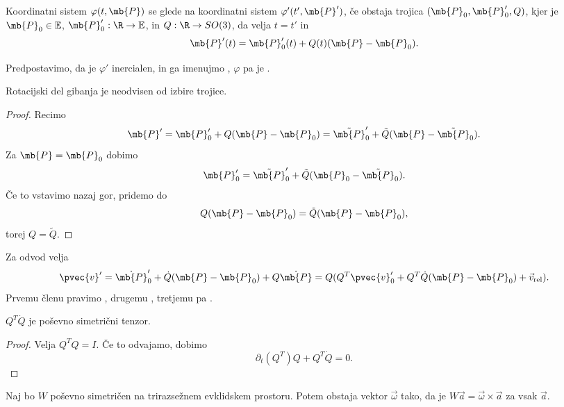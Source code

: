 
\begin{definicija}
  Koordinatni sistem $\varphi(t, \mb{P})$ se  glede na koordinatni
  sistem $\varphi'(t', \mb{P}')$, če obstaja trojica $(\mb{P}_0, \mb{P}_0', Q)$,
  kjer je $\mb{P}_0 \in \mathbb{E}$, $\mb{P}_0' : \R \to \mathbb{E}$, in $Q: \R
  \to SO(3)$, da velja $t = t'$ in
  \[
	\mb{P}'(t) = \mb{P}_0'(t) + Q(t) (\mb{P} - \mb{P}_0).
  \]
\end{definicija}

Predpostavimo, da je $\varphi'$ inercialen, in ga imenujmo , $\varphi$ pa je .

\begin{trditev}
  Rotacijski del gibanja je neodvisen od izbire trojice.
\end{trditev}

\begin{proof}
  Recimo
  \[
	\mb{P}' = \mb{P}_0' + Q (\mb{P} - \mb{P}_0)
	= \tilde{\mb{P}}_0' + \tilde{Q} (\mb{P} - \tilde{\mb{P}}_0).
  \]
  Za $\mb{P} = \mb{P}_0$ dobimo
  \[
	\mb{P}_0' = \tilde{\mb{P}}_0' + \tilde{Q} (\mb{P}_0 - \tilde{\mb{P}}_0).
  \]
  Če to vstavimo nazaj gor, pridemo do
  \[
	Q(\mb{P} - \mb{P}_0) = \tilde{Q}(\mb{P} - \mb{P}_0),
  \]
  torej $Q = \tilde{Q}$.
\end{proof}


Za odvod velja
\[
  \pvec{v}' = \dot{\mb{P}}_0' + \dot{Q} (\mb{P} - \mb{P}_0) + Q \dot{\mb{P}}
  = Q(Q^T \pvec{v}_0' + Q^T \dot{Q} (\mb{P} - \mb{P}_0) + \vec{v}_{\text{rel}}).
\]
Prvemu členu pravimo , drugemu , tretjemu pa .

\begin{trditev}
  $Q^T \dot{Q}$ je poševno simetrični tenzor.
\end{trditev}

\begin{proof}
  Velja $Q^T Q = I$.
  Če to odvajamo, dobimo
  \[
	\partial_t (Q^T) Q + Q^T \dot{Q} = 0.
  \]
\end{proof}

\begin{izrek}
  Naj bo $W$ poševno simetričen na trirazsežnem evklidskem prostoru.
  Potem obstaja vektor $\vec{\omega}$ tako, da je $W \vec{a} = \vec{\omega}
  \times \vec{a}$ za vsak $\vec{a}$.
\end{izrek}

